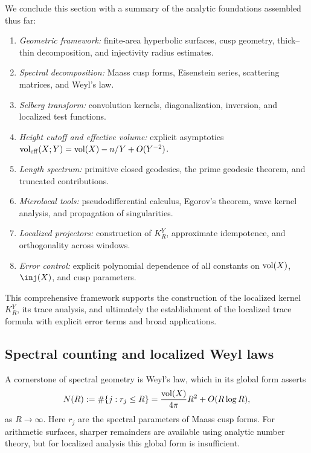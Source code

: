 We conclude this section with a summary of the analytic foundations assembled thus far:

\begin{enumerate}
  \item \emph{Geometric framework:} finite-area hyperbolic surfaces, cusp geometry, 
        thick–thin decomposition, and injectivity radius estimates.
  \item \emph{Spectral decomposition:} Maass cusp forms, Eisenstein series, scattering matrices, 
        and Weyl’s law.
  \item \emph{Selberg transform:} convolution kernels, diagonalization, inversion, 
        and localized test functions.
  \item \emph{Height cutoff and effective volume:} explicit asymptotics 
        $\operatorname{vol}_{\mathrm{eff}}(X;Y) = \operatorname{vol}(X)-n/Y+O(Y^{-2})$.
  \item \emph{Length spectrum:} primitive closed geodesics, the prime geodesic theorem, 
        and truncated contributions.
  \item \emph{Microlocal tools:} pseudodifferential calculus, Egorov’s theorem, 
        wave kernel analysis, and propagation of singularities.
  \item \emph{Localized projectors:} construction of $K_R^Y$, approximate idempotence, 
        and orthogonality across windows.
  \item \emph{Error control:} explicit polynomial dependence of all constants 
        on $\operatorname{vol}(X)$, $\inj(X)$, and cusp parameters.
\end{enumerate}

This comprehensive framework supports the construction of the localized kernel $K_R^Y$, 
its trace analysis, and ultimately the establishment of the localized trace formula 
with explicit error terms and broad applications.

\subsection{Spectral counting and localized Weyl laws}\label{subsec:weyl}

A cornerstone of spectral geometry is Weyl’s law, which in its global form asserts
\begin{equation}\label{eq:weyl-global}
  N(R) := \#\{ j : r_j \le R \} 
  = \frac{\operatorname{vol}(X)}{4\pi}R^2 + O(R \log R),
\end{equation}
as $R \to \infty$.  
Here $r_j$ are the spectral parameters of Maass cusp forms.  
For arithmetic surfaces, sharper remainders are available using analytic number theory, 
but for localized analysis this global form is insufficient.

